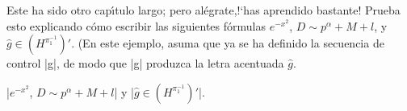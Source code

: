 


\bigskip

\def\ghat{\hat g}
\enunciadoS Este ha sido otro cap\'{\i}tulo largo; pero
al\'egrate,!`has aprendido bastante! Prueba esto explicando c\'omo
escribir las siguientes f\'ormulas $e^{-x^2}$, $D \sim p^{\alpha} + M
+ l$, y $\ghat \in (H^{\pi_1^{-1}})'$. (En este ejemplo, asuma que ya
se ha definido la secuencia de control |\ghat|, de modo que |\ghat|
produzca la letra acentuada $\ghat$.

\bigskip

\respuestaS |$e^{-x^2}$, $D \sim p^{\alpha} + M + l$| y 
|$\ghat \in (H^{\pi_1^{-1}})'$|.

\bye


